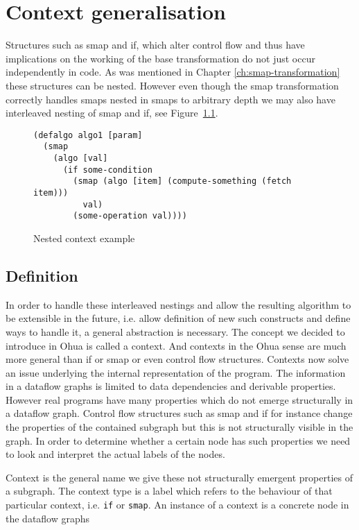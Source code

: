 \chapter{Context generalisation}

\label{ch:Context}

Structures such as smap and if, which alter control flow and thus have implications on the working of the \yauhau{} base transformation do not just occur independently in code.
As was mentioned in Chapter \ref{ch:smap-transformation} these structures can be nested.
However even though the smap transformation correctly handles smaps nested in smaps to arbitrary depth we may also have interleaved nesting of smap and if, see Figure~\ref{fig:nested-context-example}.

\begin{figure}
\begin{verbatim}
(defalgo algo1 [param]
  (smap
    (algo [val]
      (if some-condition
        (smap (algo [item] (compute-something (fetch item)))
          val)
        (some-operation val))))
\end{verbatim}
\caption{Nested context example}
\label{fig:nested-context-example}
\end{figure}

\section{Definition}

In order to handle these interleaved nestings and allow the resulting algorithm to be extensible in the future, i.e. allow definition of new such constructs and define ways to handle it, a general abstraction is necessary.
The concept we decided to introduce in Ohua is called a context.
And contexts in the Ohua sense are much more general than if or smap or even control flow structures.
Contexts now solve an issue underlying the internal representation of the program.
The information in a dataflow graphs is limited to data dependencies and derivable properties.
However real programs have many properties which do not emerge structurally in a dataflow graph.
Control flow structures such as smap and if for instance change the properties of the contained subgraph but this is not structurally visible in the graph.
In order to determine whether a certain node has such properties we need to look and interpret the actual labels of the nodes.

Context is the general name we give these not structurally emergent properties of a subgraph.
The context type is a label which refers to the behaviour of that particular context, i.e. \texttt{if} or \texttt{smap}.
An instance of a context is a concrete node in the dataflow graphs

